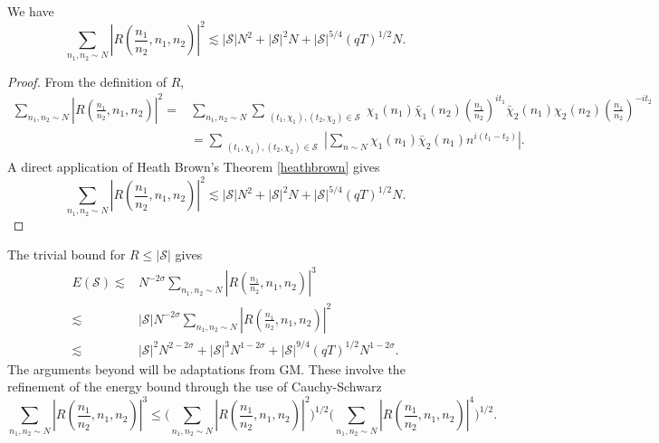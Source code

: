 \begin{lemma}
    We have 
\[
        \sum_{n_1,n_2\sim N}\left|R\left(\frac{n_1}{n_2},n_1,n_2\right) \right|^2\lesssim |\mathcal{S}|N^2+ |\mathcal{S}|^2N + |\mathcal{S}|^{5/4}(qT)^{1/2}N.
    \]
\end{lemma}
\begin{proof}
    From the definition of $R$, \begin{align*}
        \sum_{n_1,n_2\sim N}\left|R\left(\frac{n_1}{n_2},n_1,n_2\right) \right|^2=& \sum_{n_1,n_2\sim N}\sum_{\substack{(t_1,\chi_1),(t_2,\chi_2)\in \mathcal{S}}}
        \chi_1(n_1)\bar{\chi}_1(n_2)\left(\frac{n_1}{n_2}\right)^{it_1}\bar{\chi}_2(n_1){\chi}_2(n_2)\left(\frac{n_1}{n_2}\right)^{-it_2}
        \\
        &=\sum_{\substack{(t_1,\chi_1),(t_2,\chi_2)\in \mathcal{S}}}\left|\sum_{n\sim N}
        \chi_1(n_1)\bar{\chi}_2(n_1)n^{i(t_1-t_2)}\right|.
    \end{align*}
    A direct application of Heath Brown's Theorem \ref{heathbrown} gives \[
        \sum_{n_1,n_2\sim N}\left|R\left(\frac{n_1}{n_2},n_1,n_2\right) \right|^2\lesssim |\mathcal{S}|N^2+ |\mathcal{S}|^2N + |\mathcal{S}|^{5/4}(qT)^{1/2}N.
    \]
\end{proof}
The trivial bound for $R\leq |\mathcal{S}|$ gives \begin{align*}
    E(\mathcal{S})\lesssim& N^{-2\sigma}\sum_{n_1,n_2\sim N}\left|R\left(\frac{n_1}{n_2},n_1,n_2\right) \right|^3\\
    \lesssim &|\mathcal{S}|N^{-2\sigma}\sum_{n_1,n_2\sim N}\left|R\left(\frac{n_1}{n_2},n_1,n_2\right) \right|^2\\
    \lesssim& |\mathcal{S}|^2N^{2-2\sigma}+ |\mathcal{S}|^3N^{1-2\sigma} + |\mathcal{S}|^{9/4}(qT)^{1/2}N^{{1-2\sigma}}.
\end{align*}
The arguments beyond will be adaptations from GM. These involve the refinement of the energy bound through the use of Cauchy-Schwarz\[
    \sum_{n_1,n_2\sim N}\left|R\left(\frac{n_1}{n_2},n_1,n_2\right) \right|^3\leq  \Big(\sum_{n_1,n_2\sim N}\left|R\left(\frac{n_1}{n_2},n_1,n_2\right) \right|^2\Big)^{1/2} \Big(\sum_{n_1,n_2\sim N}\left|R\left(\frac{n_1}{n_2},n_1,n_2\right) \right|^4 \Big)^{1/2}.
\]

